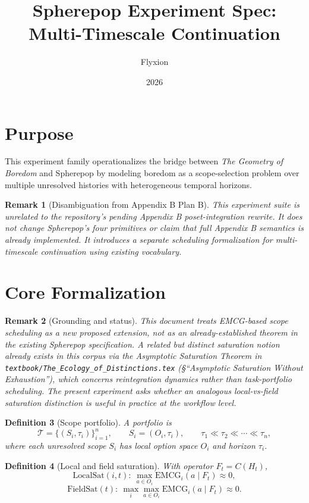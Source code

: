 \documentclass[11pt]{article}
\title{Spherepop Experiment Spec: Multi-Timescale Continuation}
\author{Flyxion}
\date{2026}
\newtheorem{definition}{Definition}[section]
\newtheorem{remark}[definition]{Remark}
\begin{document}
\maketitle

\section{Purpose}

This experiment family operationalizes the bridge between \emph{The Geometry of Boredom}
and Spherepop by modeling boredom as a scope-selection problem over multiple unresolved
histories with heterogeneous temporal horizons.

\begin{remark}[Disambiguation from Appendix B Plan B]
This experiment suite is unrelated to the repository's pending Appendix B poset-integration
rewrite. It does not change Spherepop's four primitives or claim that full Appendix B
semantics is already implemented. It introduces a separate scheduling formalization for
multi-timescale continuation using existing vocabulary.
\end{remark}

\section{Core Formalization}

\begin{remark}[Grounding and status]
This document treats EMCG-based scope scheduling as a \emph{new proposed extension}, not as
an already-established theorem in the existing Spherepop specification. A related but distinct
saturation notion already exists in this corpus via the Asymptotic Saturation Theorem in
\texttt{textbook/The\_Ecology\_of\_Distinctions.tex} (\S ``Asymptotic Saturation Without
Exhaustion''), which concerns reintegration dynamics rather than task-portfolio scheduling.
The present experiment asks whether an analogous local-vs-field saturation distinction is
useful in practice at the workflow level.
\end{remark}

\begin{definition}[Scope portfolio]
A portfolio is
\[
\mathcal{T}=\{(S_i,\tau_i)\}_{i=1}^n,\qquad S_i=(O_i,\tau_i),\qquad
\tau_1\ll\tau_2\ll\cdots\ll\tau_n,
\]
where each unresolved scope $S_i$ has local option space $O_i$ and horizon $\tau_i$.
\end{definition}

\begin{definition}[Local and field saturation]
With operator $F_t=C(H_t)$,
\[
\text{LocalSat}(i,t):\ \max_{a\in O_i}\mathrm{EMCG}_i(a\mid F_t)\approx0,
\]
\[
\text{FieldSat}(t):\ \max_i\max_{a\in O_i}\mathrm{EMCG}_i(a\mid F_t)\approx0.
\]
\end{definition}
\end{document}
